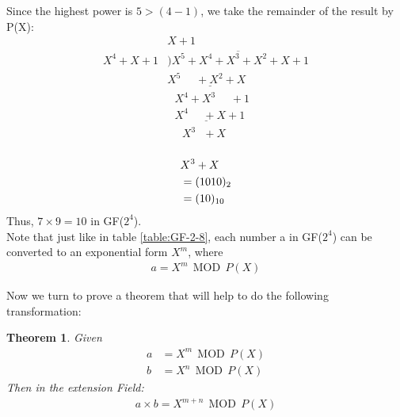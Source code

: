 \documentclass[journal]{IEEEtran}
\begin{document}
\subsubsection{}
    Since the highest power is $5 > (4-1)$, we take the remainder of the result by P(X):
$$
\begin{array}{lr} 
& X+1 \\ 
X^4+X+1 \!\!\!\!\!\! & \overline{)X^5 + X^4 + X^3 + X^2 + X + 1}\\ 
& \underline{X^5 \text{\ \ \ \ \ \ \ }\text{\ \ \ \ \ \ \ \ }+X^2+X \text{\ \ \ \ \ }} \\ 
& {\text{\ \ \ \ \ \ \ } X^4+X^3\text{\ \ \ \ \ \ \ }\text{\ \ \ \ \ \ \ }+1}\\
& \underline{\text{\ \ \ \ \ \ \ } X^4 \text{\ \ \ \ \ \ \ \ }\text{\ \ \ \ \ \ \ \ }+X+1}\\
&{\text{\ \ \ \ \ \ \ \ }\text{\ \ \ \ \ \ \ \ \ }X^3\text{\ \ \ \ \ \ \ \ }+X\text{\ \ \ \ \ }}
\end{array}
$$

\subsubsection{}
    \begin{align}
        &X^3 + X\notag\\
        &= (1010)_{2}\notag\\
        &= (10)_{10}\notag
    \end{align}
Thus, \(7 \times 9 = 10\) in GF($2^4$). \\
    
Note that just like in table \ref{table:GF-2-8}, each number a in GF($2^4$) can be converted to an exponential form $X^m$, where 
    \begin{align}
        a = X^m \ \ \text{MOD} \ \ P(X)
    \end{align}

Now we turn to prove a theorem that will help to do the following transformation:
\newtheorem{thm}{\bf Theorem}
\begin{thm}\label{Thm1}
    Given 
    \begin{align}
        a &= X^m \ \ \text{MOD} \ \ P(X)\\
        b &= X^n \ \ \text{MOD} \ \ P(X)
    \end{align}
    Then in the extension Field:
    \begin{align}
        a \times b = X^{m+n} \ \ \text{MOD} \ \ P(X)
    \end{align}
\end{thm}
\end{document}
